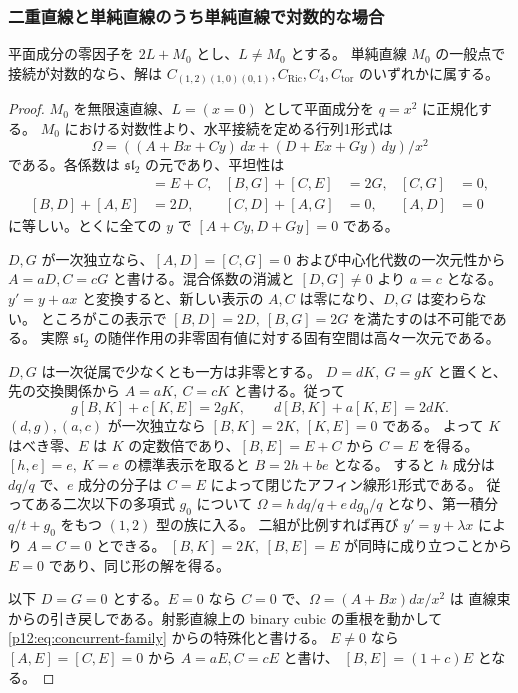 \subsubsection{二重直線と単純直線のうち単純直線で対数的な場合}
\begin{proposition}\label{p12:th:double-good}
平面成分の零因子を $2L+M_0$ とし、$L\ne M_0$ とする。
単純直線 $M_0$ の一般点で接続が対数的なら、解は
$C_{(1,2)(1,0)(0,1)}, C_{\mathrm{Ric}}, C_4, C_{\mathrm{tor}}$
のいずれかに属する。
\end{proposition}
\begin{proof}
$M_0$ を無限遠直線、$L=(x=0)$ として平面成分を $q=x^2$ に正規化する。
$M_0$ における対数性より、水平接続を定める行列1形式は
\[
 \Omega=((A+Bx+Cy)\,dx+(D+Ex+Gy)\,dy)/x^2
\]
である。各係数は $\mathfrak{sl}_2$ の元であり、平坦性は
\begin{align*}
 [B,E]&=E+C,&[B,G]+[C,E]&=2G,&[C,G]&=0,\\
 [B,D]+[A,E]&=2D,&[C,D]+[A,G]&=0,&[A,D]&=0
\end{align*}
に等しい。とくに全ての $y$ で $[A+Cy,D+Gy]=0$ である。

$D,G$ が一次独立なら、$[A,D]=[C,G]=0$ および中心化代数の一次元性から
$A=aD,C=cG$ と書ける。混合係数の消滅と $[D,G]\ne0$ より $a=c$ となる。
$y'=y+ax$ と変換すると、新しい表示の $A,C$ は零になり、$D,G$ は変わらない。
ところがこの表示で $[B,D]=2D,\ [B,G]=2G$ を満たすのは不可能である。
実際 $\mathfrak{sl}_2$ の随伴作用の非零固有値に対する固有空間は高々一次元である。

$D,G$ は一次従属で少なくとも一方は非零とする。
$D=dK,\ G=gK$ と置くと、先の交換関係から
$A=aK,\ C=cK$ と書ける。従って
\[
 g[B,K]+c[K,E]=2gK,\qquad d[B,K]+a[K,E]=2dK.
\]
$(d,g),(a,c)$ が一次独立なら $[B,K]=2K,\ [K,E]=0$ である。
よって $K$ はべき零、$E$ は $K$ の定数倍であり、$[B,E]=E+C$ から $C=E$ を得る。
$[h,e]=e,\ K=e$ の標準表示を取ると $B=2h+b e$ となる。
すると $h$ 成分は $dq/q$ で、$e$ 成分の分子は $C=E$ によって閉じたアフィン線形1形式である。
従ってある二次以下の多項式 $g_0$ について
$\Omega=h\,dq/q+e\,dg_0/q$ となり、第一積分 $q/t+g_0$ をもつ $(1,2)$ 型の族に入る。
二組が比例すれば再び $y'=y+\lambda x$ により $A=C=0$ とできる。
$[B,K]=2K,\ [B,E]=E$ が同時に成り立つことから $E=0$ であり、同じ形の解を得る。

以下 $D=G=0$ とする。$E=0$ なら $C=0$ で、$\Omega=(A+Bx)dx/x^2$ は
直線束からの引き戻しである。射影直線上の binary cubic の重根を動かして
\eqref{p12:eq:concurrent-family} からの特殊化と書ける。
$E\ne0$ なら $[A,E]=[C,E]=0$ から $A=aE,C=cE$ と書け、
$[B,E]=(1+c)E$ となる。


\end{proof}
